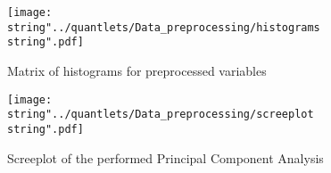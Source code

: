  
\begin{figure}[H]
  \centering
\texttt{[image: \\string"../quantlets/Data\_preprocessing/histograms\\string".pdf]}
  \caption{Matrix of histograms for preprocessed variables}\label{fig:hist}
\end{figure}


\begin{figure}[H]
  \centering
\texttt{[image: \\string"../quantlets/Data\_preprocessing/screeplot\\string".pdf]}
  \caption{Screeplot of the performed Principal Component Analysis}\label{fig:scree}
\end{figure}



 



